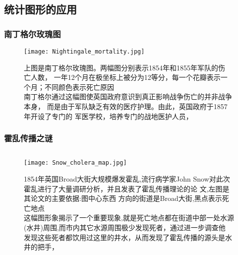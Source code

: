 \subsection{统计图形的应用}
\subsubsection{南丁格尔玫瑰图}
\begin{frame}{\subsecname}{\subsubsecname}
 \begin{figure}
   \centering
   \texttt{[image: Nightingale\_mortality.jpg]}
   \caption{上图是南丁格尔玫瑰图。两幅图分别表示1854年和1855年军队的伤
     亡人数，
     一年12个月在极坐标上被分为12等分，每一个花瓣表示一个月；不同颜色表示死亡原因\\
     南丁格尔通过这幅图使英国政府意识到真正影响战争伤亡的并非战争本身，
     而是由于军队缺乏有效的医疗护理。由此，英国政府于1857年开设了专门的
     军医学校，培养专门的战地医护人员，}
 \end{figure}
\end{frame}

\subsubsection{霍乱传播之谜}
\begin{frame}{\subsecname}{\subsubsecname}
  \begin{figure}
    \begin{columns}
      \begin{column}{.6\textwidth}
        \texttt{[image: Snow\_cholera\_map.jpg]}
      \end{column}

      \begin{column}{.35\textwidth}
        \centering
        \caption{1854年英国Broad大街大规模爆发霍乱,流行病学家John
          Snow对此次霍乱进行了大量调研分析，并且发表了霍乱传播理论的论
          文,左图是其论文的主要依据:图中心东西
          方向的街道是Broad大街,黑点表示死亡地点\\
          这幅图形象揭示了一个重要现象,就是死亡地点都在街道中部一处水源
          (水井)周围,而市内其它水源周围极少发现死者，通过进一步调查他
          发现这些死者都饮用过这里的井水，从而发现了霍乱传播的源头是水
          井的把手，}
      \end{column}
    \end{columns}
  \end{figure}
\end{frame}

